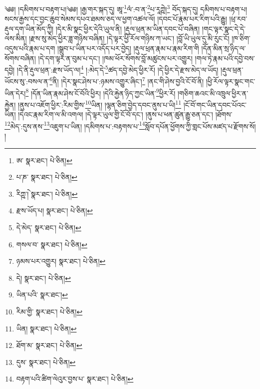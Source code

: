 \setcounter{footnote}{0} 
༄༅། །དམིགས་པ་བརྟག་པ།༄༅། །རྒྱ་གར་སྐད་དུ། ཨཱ་\footnote{ཨ་  སྣར་ཐང་།  པེ་ཅིན། }ལཾ་:བ་ན་\footnote{པ་ཎ་  སྣར་ཐང་།  པེ་ཅིན། }པ་རཱཀྵེ།\footnote{རིཀྵ་ེ།  སྣར་ཐང་།  པེ་ཅིན། } བོད་སྐད་དུ། དམིགས་པ་བརྟག་པ། སངས་རྒྱས་དང་བྱང་ཆུབ་སེམས་དཔའ་ཐམས་ཅད་ལ་ཕྱག་འཚལ་ལོ། །དབང་པོ་རྣམ་པར་རིག་པའི་རྒྱུ། །ཕྲ་རབ་རྡུལ་དག་ཡིན་མོད་ཀྱི། །དེར་མི་སྣང་ཕྱིར་དེའི་ཡུལ་ནི། །རྡུལ་ཕྲན་མ་ཡིན་དབང་པོ་བཞིན། །གང་ལྟར་སྣང་དེ་དེ་ལས་མིན། །རྫས་སུ་མེད་ཕྱིར་ཟླ་གཉིས་བཞིན། །དེ་ལྟར་ཕྱི་རོལ་གཉིས་ཀ་ཡང་། །བློ་ཡི་ཡུལ་དུ་མི་རུང་ངོ། །ཁ་ཅིག་འདུས་པའི་རྣམ་པ་དག །སྒྲུབ་པ་ཡིན་པར་འདོད་པར་བྱེད། །རྡུལ་ཕྲན་རྣམ་པ་རྣམ་རིག་གི །དོན་མིན་སྲ་ཉིད་ལ་སོགས་བཞིན། །དེ་དག་ལྟར་ན་བུམ་པ་དང་། །ཁམ་ཕོར་སོགས་བློ་མཚུངས་པར་འགྱུར། །གལ་ཏེ་རྣམ་པའི་དབྱེ་བས་དབྱེ། །དེ་ནི་རྡུལ་ཕྲན་:རྫས་ཡོད་ལ།\footnote{རྫས་ཡོད་པ།  སྣར་ཐང་།  པེ་ཅིན། } །:མེད་དེ་\footnote{དེ་མེད་  སྣར་ཐང་།  པེ་ཅིན། }ཚད་དབྱེ་མེད་ཕྱིར་རོ། །དེ་ཕྱིར་དེ་རྫས་མེད་ལ་ཡོད། །རྡུལ་ཕྲན་ཡོངས་སུ་:བསལ་ན་\footnote{གསལ་བ་  སྣར་ཐང་།  པེ་ཅིན། }ནི། །དེར་སྣང་ཤེས་པ་:ཉམས་འགྱུར་ཞིང་།\footnote{ཉམས་པར་འགྱུར།  སྣར་ཐང་།  པེ་ཅིན། } །ནང་གི་ཤེས་བྱའི་ངོ་བོ་ནི། །ཕྱི་རོལ་ལྟར་སྣང་གང་ཡིན་དེར།\footnote{དེ།  སྣར་ཐང་།  པེ་ཅིན། } །དོན་ཡིན་རྣམ་ཤེས་ངོ་བོའི་ཕྱིར། །དེའི་རྐྱེན་ཉིད་ཀྱང་ཡིན་\footnote{ཡིན་པའི་  སྣར་ཐང་། }ཕྱིར་རོ། །གཅིག་ཆའང་མི་འཁྲུལ་ཕྱིར་ན་རྐྱེན། །ནུས་པ་འཇོག་ཕྱིར་:རིམ་གྱིས་\footnote{རིམ་གྱི་  སྣར་ཐང་།  པེ་ཅིན། }ཡིན། །ལྷན་ཅིག་བྱེད་དབང་ནུས་པ་ཡི།\footnote{ཡིན།  སྣར་ཐང་།  པེ་ཅིན། } །ངོ་བོ་གང་ཡིན་དབང་པོའང་ཡིན། །དེའང་རྣམ་རིག་ལ་མི་འགལ། །དེ་ལྟར་ཡུལ་གྱི་ངོ་བོ་དང་། །ནུས་པ་ཕན་ཚུན་རྒྱུ་ཅན་དང་། །ཐོགས་\footnote{ཐོག་མ་  སྣར་ཐང་།  པེ་ཅིན། }མེད་:དུས་ནས་\footnote{དུས་  སྣར་ཐང་།  པེ་ཅིན། }འཇུག་པ་ཡིན། །དམིགས་པ་:བརྟགས་པ་\footnote{བརྟག་པའི་ཚིག་ལེའུར་བྱས་པ་  སྣར་ཐང་།  པེ་ཅིན། }སློབ་དཔོན་ཕྱོགས་ཀྱི་གླང་པོས་མཛད་པ་རྫོགས་སོ། ། 